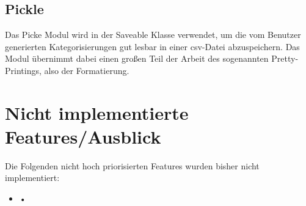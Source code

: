 \documentclass[a4paper,draft]{scrartcl}
\begin{document}
\subsection{Pickle}
Das Picke Modul wird in der Saveable Klasse verwendet, um die vom Benutzer generierten Kategorisierungen gut lesbar in einer csv-Datei abzuspeichern. Das Modul übernimmt dabei einen großen Teil der Arbeit des sogenannten Pretty-Printings, also der Formatierung.

\section{Nicht implementierte Features/Ausblick}
Die Folgenden nicht hoch priorisierten Features wurden bisher nicht 
implementiert:
\begin{itemize}
\item •
\end{itemize}
\end{document}
